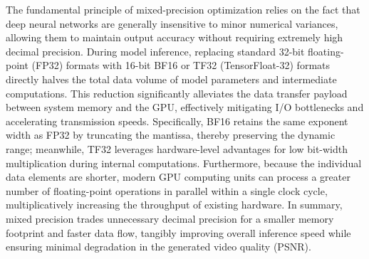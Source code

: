 The fundamental principle of mixed-precision optimization relies on the fact that deep neural networks are generally insensitive to minor numerical variances, allowing them to maintain output accuracy without requiring extremely high decimal precision. 
During model inference, replacing standard 32-bit floating-point (FP32) formats with 16-bit BF16 or TF32 (TensorFloat-32) formats directly halves the total data volume of model parameters and intermediate computations. 
This reduction significantly alleviates the data transfer payload between system memory and the GPU, effectively mitigating I/O bottlenecks and accelerating transmission speeds. 
Specifically, BF16 retains the same exponent width as FP32 by truncating the mantissa, thereby preserving the dynamic range; meanwhile, TF32 leverages hardware-level advantages for low bit-width multiplication during internal computations.  
Furthermore, because the individual data elements are shorter, modern GPU computing units can process a greater number of floating-point operations in parallel within a single clock cycle, multiplicatively increasing the throughput of existing hardware. 
In summary, mixed precision trades unnecessary decimal precision for a smaller memory footprint and faster data flow, tangibly improving overall inference speed while ensuring minimal degradation in the generated video quality (PSNR).

